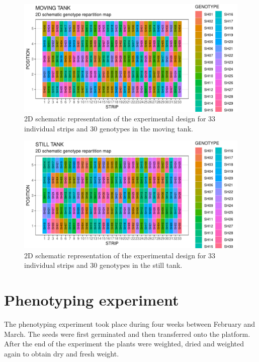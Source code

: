 \begin{figure}
    \includegraphics[width=\textwidth]{figures/moving_layout_30_genotypes.pdf} 
    \caption{2D schematic representation of the experimental design for 33 individual strips and 30 genotypes in the moving tank.}
    \label{fig:moving_layout_30_geno}
\end{figure}

\begin{figure}
    \includegraphics[width=\textwidth]{figures/still_layout_30_genotypes.pdf} 
    \caption{2D schematic representation of the experimental design for 33 individual strips and 30 genotypes in the still tank.}
    \label{fig:still_layout_30_geno}
\end{figure}


\section{Phenotyping experiment}
The phenotyping experiment took place during four weeks between February and March. The seeds were first germinated and then transferred onto the platform. After the end of the experiment the plants were weighted, dried and weighted again to obtain dry and fresh weight.

